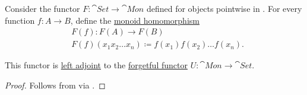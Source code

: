 \begin{corollary}\label{thm:free_monoid_functor}
  Consider the functor \( F: \cat{Set} \to \cat{Mon} \) defined for objects pointwise in . For every function \( f: A \to B \), define the \hyperref[def:unital_magma/homomorphism]{monoid homomorphism}
  \begin{equation*}
    \begin{aligned}
      &F(f): F(A) \to F(B) \\
      &F(f)(x_1 x_2 \ldots x_n) \coloneqq f(x_1) f(x_2) \ldots f(x_n).
    \end{aligned}
  \end{equation*}

  This functor is \hyperref[def:category_adjunction]{left adjoint} to the \hyperref[def:concrete_category]{forgetful functor} \( U: \cat{Mon} \to \cat{Set} \).
\end{corollary}
\begin{proof}
  Follows from  via .
\end{proof}

